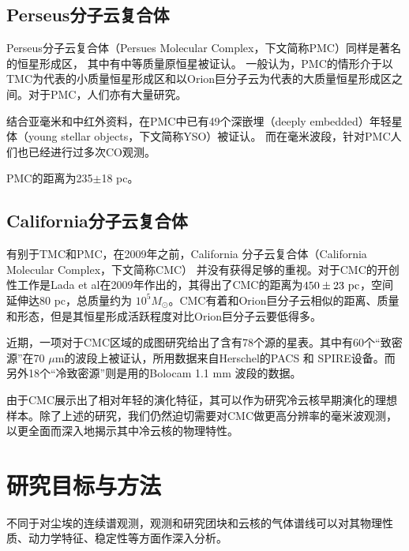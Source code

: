 \documentclass[UTF8, nocolorlinks]{pkuthss}
\begin{document}
		\subsection{Perseus分子云复合体}

			Perseus分子云复合体（Persues Molecular Complex，下文简称PMC）同样是著名的恒星形成区， 其中有中等质量原恒星被证认\supercite{2010A&A...512A..67L}。 一般认为，PMC的情形介于以TMC为代表的小质量恒星形成区和以Orion巨分子云为代表的大质量恒星形成区之间\supercite{2010ApJ...711..655J}。对于PMC，人们亦有大量研究。

			结合亚毫米和中红外资料，在PMC中已有49个深嵌埋（deeply embedded）年轻星体（young stellar objects，下文简称YSO）被证认\supercite{2007ApJ...656..293J}。 而在毫米波段，针对PMC人们也已经进行过多次CO观测\supercite{1979ApJ...233..163S,1999ApJ...525..318P, 2005A&A...440..151H}。

			PMC的距离为235$\pm$18 pc\supercite{2010A&A...512A..67L}。

		\subsection{California分子云复合体}

			有别于TMC和PMC，在2009年之前，California 分子云复合体（California Molecular Complex，下文简称CMC） 并没有获得足够的重视。对于CMC的开创性工作是Lada et al在2009年作出的，其得出了CMC的距离为$450\pm23\rm\ pc$，空间延伸达80 pc，总质量约为 $10^5 M_\odot$\supercite{2009ApJ...703...52L}。CMC有着和Orion巨分子云相似的距离、质量和形态，但是其恒星形成活跃程度对比Orion巨分子云要低得多\supercite{2009ApJ...703...52L,2010A&A...512A..67L}。

			近期，一项对于CMC区域的成图研究给出了含有78个源的星表\supercite{2013ApJ...764..133H}。其中有60个“致密源”在70 $\mu$m的波段上被证认，所用数据来自Herschel的PACS 和 SPIRE设备\supercite{2013ApJ...764..133H}。而另外18个“冷致密源”则是用的Bolocam 1.1 mm 波段的数据\supercite{2013ApJ...764..133H}。

			由于CMC展示出了相对年轻的演化特征，其可以作为研究冷云核早期演化的理想样本。除了上述的研究，我们仍然迫切需要对CMC做更高分辨率的毫米波观测，以更全面而深入地揭示其中冷云核的物理特性。

	\section{研究目标与方法}

		不同于对尘埃的连续谱观测，观测和研究团块和云核的气体谱线可以对其物理性质、动力学特征、稳定性等方面作深入分析。
\end{document}
